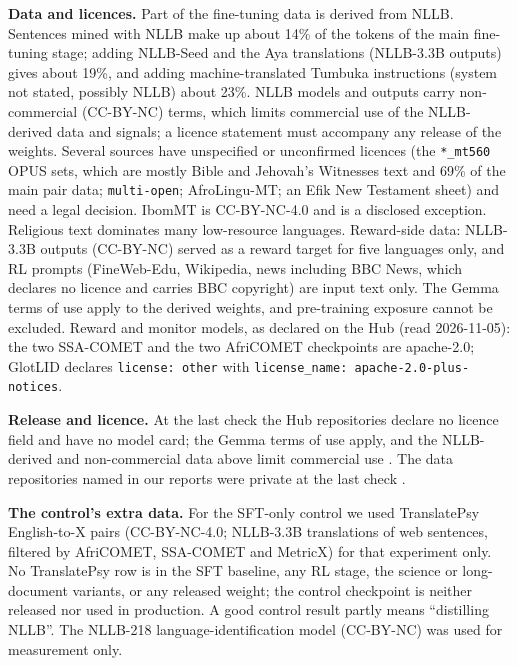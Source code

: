 \textbf{Data and licences.} Part of the fine-tuning data is derived from NLLB. Sentences mined with NLLB make up about 14\% of the tokens of the main fine-tuning stage; adding NLLB-Seed and the Aya translations (NLLB-3.3B outputs) gives about 19\%, and adding machine-translated Tumbuka instructions (system not stated, possibly NLLB) about 23\%. NLLB models and outputs carry non-commercial (CC-BY-NC) terms, which limits commercial use of the NLLB-derived data and signals; a licence statement must accompany any release of the weights. Several sources have unspecified or unconfirmed licences (the \texttt{*\_mt560} OPUS sets, which are mostly Bible and Jehovah's Witnesses text and 69\% of the main pair data; \texttt{multi-open}; AfroLingu-MT; an Efik New Testament sheet) and need a legal decision. IbomMT is CC-BY-NC-4.0 and is a disclosed exception. Religious text dominates many low-resource languages. Reward-side data: NLLB-3.3B outputs (CC-BY-NC) served as a reward target for five languages only, and RL prompts (FineWeb-Edu, Wikipedia, news including BBC News, which declares no licence and carries BBC copyright) are input text only. The Gemma terms of use apply to the derived weights, and pre-training exposure cannot be excluded. Reward and monitor models, as declared on the Hub (read 2026-11-05): the two SSA-COMET and the two AfriCOMET checkpoints are apache-2.0; GlotLID declares \texttt{license: other} with \texttt{license\_name: apache-2.0-plus-notices}.

\textbf{Release and licence.}  At the last check the Hub repositories declare no licence field and have no model card; the Gemma terms of use apply, and the NLLB-derived and non-commercial data above limit commercial use . The data repositories named in our reports were private at the last check .

\textbf{The control's extra data.} For the SFT-only control we used TranslatePsy English-to-X pairs (CC-BY-NC-4.0; NLLB-3.3B translations of web sentences, filtered by AfriCOMET, SSA-COMET and MetricX) for that experiment only. No TranslatePsy row is in the SFT baseline, any RL stage, the science or long-document variants, or any released weight; the control checkpoint is neither released nor used in production. A good control result partly means ``distilling NLLB''. The NLLB-218 language-identification model (CC-BY-NC) was used for measurement only.


